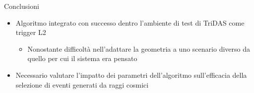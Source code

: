 \documentclass[aspectratio=169]{beamer}
\begin{document}
  \begin{frame}{Conclusioni}
      \begin{itemize}
        \item Algoritmo integrato con successo dentro l'ambiente di test di TriDAS come trigger L2
            \begin{itemize}
                \item Nonostante difficoltà nell'adattare la geometria a uno scenario diverso da quello per cui il sistema era pensato 
            \end{itemize}
        \item Necessario valutare l'impatto dei parametri dell'algoritmo sull'efficacia della selezione di eventi generati da raggi cosmici
      \end{itemize}
  \end{frame}
\end{document}
